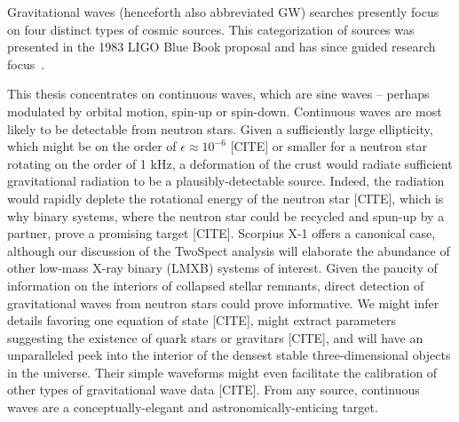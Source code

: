 		Gravitational waves (henceforth also abbreviated GW) searches presently focus on four distinct types of cosmic sources.
This categorization of sources was presented in the 1983 LIGO Blue Book proposal and has since guided research focus~\cite{CollinsGravityShadow}. 

This thesis concentrates on continuous waves, which are sine waves -- perhaps modulated by orbital motion, spin-up or spin-down. Continuous waves are most likely to be detectable from neutron stars. Given a sufficiently large ellipticity, which might be on the order of $\epsilon \approx 10^{-6}$ [CITE] or smaller for a neutron star rotating on the order of 1 kHz, a deformation of the crust would radiate sufficient gravitational radiation to be a plausibly-detectable source. Indeed, the radiation would rapidly deplete the rotational energy of the neutron star [CITE], which is why binary systems, where the neutron star could be recycled and spun-up by a partner, prove a promising target [CITE]. Scorpius X-1 offers a canonical case, although our discussion of the TwoSpect analysis will elaborate the abundance of other low-mass X-ray binary (LMXB) systems of interest. Given the paucity of information on the interiors of collapsed stellar remnants, direct detection of gravitational waves from neutron stars could prove informative. We might infer details favoring one equation of state [CITE], might extract parameters suggesting the existence of quark stars or gravitars [CITE], and will have an unparalleled peek into the interior of the densest stable three-dimensional objects in the universe. Their simple waveforms might even facilitate the calibration of other types of gravitational wave data [CITE]. From any source, continuous waves are a conceptually-elegant and astronomically-enticing target.

